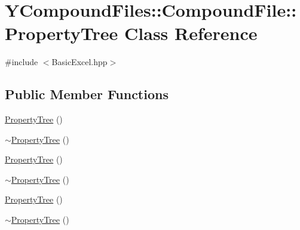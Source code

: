 \hypertarget{class_y_compound_files_1_1_compound_file_1_1_property_tree}{}\section{Y\+Compound\+Files\+:\+:Compound\+File\+:\+:Property\+Tree Class Reference}
\label{class_y_compound_files_1_1_compound_file_1_1_property_tree}


{\ttfamily \#include $<$Basic\+Excel.\+hpp$>$}

\subsection*{Public Member Functions}
\begin{DoxyCompactItemize}
\item 
\hyperlink{class_y_compound_files_1_1_compound_file_1_1_property_tree_a44ddbf2704ad9e73bee649e67066c7a7}{Property\+Tree} ()
\item 
\hyperlink{class_y_compound_files_1_1_compound_file_1_1_property_tree_abbda6ebf7d24275853685beb734c0c14}{$\sim$\+Property\+Tree} ()
\item 
\hyperlink{class_y_compound_files_1_1_compound_file_1_1_property_tree_a44ddbf2704ad9e73bee649e67066c7a7}{Property\+Tree} ()
\item 
\hyperlink{class_y_compound_files_1_1_compound_file_1_1_property_tree_abbda6ebf7d24275853685beb734c0c14}{$\sim$\+Property\+Tree} ()
\item 
\hyperlink{class_y_compound_files_1_1_compound_file_1_1_property_tree_a44ddbf2704ad9e73bee649e67066c7a7}{Property\+Tree} ()
\item 
\hyperlink{class_y_compound_files_1_1_compound_file_1_1_property_tree_abbda6ebf7d24275853685beb734c0c14}{$\sim$\+Property\+Tree} ()
\end{DoxyCompactItemize}
